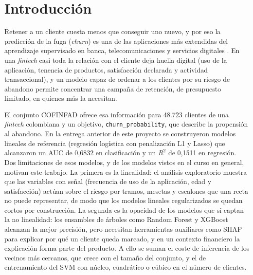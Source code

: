 \documentclass[pdflatex,sn-mathphys-num]{sn-jnl}
\newcommand{\cp}{\texttt{churn\_probability}}
\begin{document}
\maketitle

\section{Introducción}\label{sec:intro}

Retener a un cliente cuesta menos que conseguir uno nuevo, y por eso la predicción de la fuga (\textit{churn}) es una de las aplicaciones más extendidas del aprendizaje supervisado en banca, telecomunicaciones y servicios digitales \cite{verbeke2012churn}. En una \textit{fintech} casi toda la relación con el cliente deja huella digital (uso de la aplicación, tenencia de productos, satisfacción declarada y actividad transaccional), y un modelo capaz de ordenar a los clientes por su riesgo de abandono permite concentrar una campaña de retención, de presupuesto limitado, en quienes más la necesitan.

El conjunto COFINFAD \cite{cofinfad2025} ofrece esa información para 48.723 clientes de una \textit{fintech} colombiana y un objetivo, \cp, que describe la propensión al abandono. En la entrega anterior de este proyecto se construyeron modelos lineales de referencia (regresión logística con penalización L1 y Lasso) que alcanzaron un AUC de 0,6832 en clasificación y un $R^2$ de 0,1511 en regresión. Dos limitaciones de esos modelos, y de los modelos vistos en el curso en general, motivan este trabajo. La primera es la linealidad: el análisis exploratorio muestra que las variables con señal (frecuencia de uso de la aplicación, edad y satisfacción) actúan sobre el riesgo por tramos, mesetas y escalones que una recta no puede representar, de modo que los modelos lineales regularizados \cite{tibshirani1996lasso,hoerl1970ridge} se quedan cortos por construcción. La segunda es la opacidad de los modelos que sí captan la no linealidad: los ensambles de árboles como Random Forest \cite{breiman2001rf} y XGBoost \cite{chen2016xgboost} alcanzan la mejor precisión, pero necesitan herramientas auxiliares como SHAP \cite{lundberg2017shap} para explicar por qué un cliente queda marcado, y en un contexto financiero la explicación forma parte del producto. A ello se suman el coste de inferencia de los vecinos más cercanos, que crece con el tamaño del conjunto, y el de entrenamiento del SVM con núcleo, cuadrático o cúbico en el número de clientes.
\end{document}

